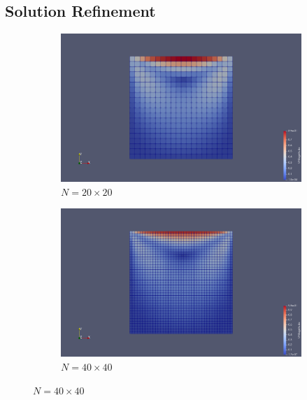 \documentclass[11pt]{article}
\begin{document}
\subsection{Solution Refinement}
\begin{figure}[H]
   \centering
   \begin{subfigure}{0.495\linewidth}
      \includegraphics[width=\linewidth]{images/paraview_U_20.png}
      \caption{$N = 20 \times 20$}
   \end{subfigure}
   \begin{subfigure}{0.495\linewidth}
      \includegraphics[width=\linewidth]{images/paraview_U_40.png}
      \caption{$N = 40 \times 40$}
   \end{subfigure}
   \vspace{5mm}


\end{figure}
\end{document}
